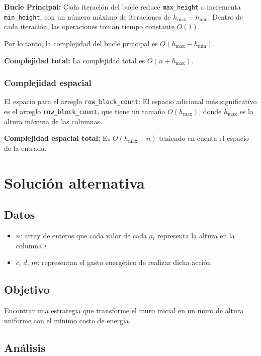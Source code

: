 \documentclass[a4paper,12pt]{article}
\begin{document}
\textbf{Bucle Principal:}
Cada iteración del bucle reduce \texttt{max\_height} o incrementa \texttt{min\_height}, con un número máximo de iteraciones de \(h_{\text{max}} - h_{\text{min}}\). Dentro de cada iteración, las operaciones toman tiempo constante \(O(1)\).

Por lo tanto, la complejidad del bucle principal es \(O(h_{\text{max}} - h_{\text{min}})\).

\textbf{Complejidad total:} La complejidad total es \(O(n + h_{\text{max}})\).

\subsubsection{Complejidad espacial}

El espacio para el arreglo \texttt{row\_block\_count}:
El espacio adicional más significativo es el arreglo \texttt{row\_block\_count}, que tiene un tamaño \(O(h_{\text{max}})\), donde \(h_{\text{max}}\) es la altura máxima de las columnas.

\textbf{Complejidad espacial total:}
Es \(O(h_{\text{max}} + n)\) teniendo en cuenta el espacio de la entrada.

\section{Solución alternativa}

\subsection{Datos}

\begin{itemize}
	\item \(n\): array de enteros que cada valor de cada $a_{i}$ representa la altura en la columna \(i\)
	\item \(c\), \(d\), \(m\): representan el gasto energético de realizar dicha acción
\end{itemize}

\subsection{Objetivo}
Encontrar una estrategia que transforme el muro inicial en un muro de altura uniforme con el mínimo costo de energía.

\subsection{Análisis}
\end{document}
